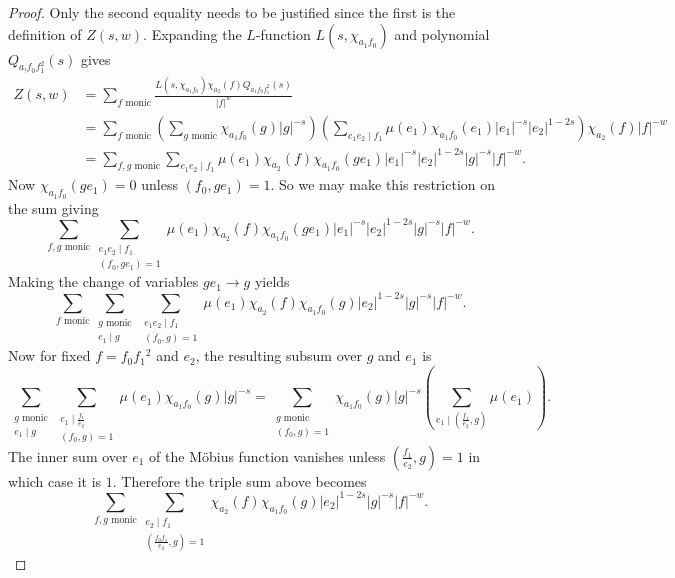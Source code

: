 \documentclass[12pt,reqno,oneside]{amsart}
\begin{document}
    \begin{proof}
        Only the second equality needs to be justified since the first is the definition of $Z(s,w)$. Expanding the $L$-function $L(s,\chi_{a_{1}f_{0}})$ and polynomial $Q_{a_{!}f_{0}f_{1}^{2}}(s)$ gives
        \begin{align*}
            Z(s,w) &= \sum_{\text{$f$ monic}}\frac{L(s,\chi_{a_{1}f_{0}})\chi_{a_{2}}(f)Q_{a_{1}f_{0}f_{1}^{2}}(s)}{|f|^{w}} \\
            &= \sum_{\text{$f$ monic}}\left(\sum_{\text{$g$ monic}}\chi_{a_{1}f_{0}}(g)|g|^{-s}\right)\left(\sum_{e_{1}e_{2} \mid f_{1}}\mu(e_{1})\chi_{a_{1}f_{0}}(e_{1})|e_{1}|^{-s}|e_{2}|^{1-2s}\right)\chi_{a_{2}}(f)|f|^{-w} \\
            &= \sum_{\text{$f,g$ monic}}\sum_{e_{1}e_{2} \mid f_{1}}\mu(e_{1})\chi_{a_{2}}(f)\chi_{a_{1}f_{0}}(ge_{1})|e_{1}|^{-s}|e_{2}|^{1-2s}|g|^{-s}|f|^{-w}.
        \end{align*}
        Now $\chi_{a_{1}f_{0}}(ge_{1}) = 0$ unless $(f_{0},ge_{1}) = 1$. So we may make this restriction on the sum giving
        \[
            \sum_{\text{$f,g$ monic}}\sum_{\substack{e_{1}e_{2} \mid f_{1} \\ (f_{0},ge_{1}) = 1}}\mu(e_{1})\chi_{a_{2}}(f)\chi_{a_{1}f_{0}}(ge_{1})|e_{1}|^{-s}|e_{2}|^{1-2s}|g|^{-s}|f|^{-w}.
        \]
        Making the change of variables $ge_{1} \to g$ yields
        \[
            \sum_{\text{$f$ monic}}\sum_{\substack{\text{$g$ monic} \\ e_{1} \mid g}}\sum_{\substack{e_{1}e_{2} \mid f_{1} \\ (f_{0},g) = 1}}\mu(e_{1})\chi_{a_{2}}(f)\chi_{a_{1}f_{0}}(g)|e_{2}|^{1-2s}|g|^{-s}|f|^{-w}.
        \]
        Now for fixed $f = f_{0}f_{1}{^{2}}$ and $e_{2}$, the resulting subsum over $g$ and $e_{1}$ is
        \[
            \sum_{\substack{\text{$g$ monic} \\ e_{1} \mid g}}\sum_{\substack{e_{1} \mid \frac{f_{1}}{e_{2}} \\ (f_{0},g) = 1}}\mu(e_{1})\chi_{a_{1}f_{0}}(g)|g|^{-s} = \sum_{\substack{\text{$g$ monic} \\ (f_{0},g) = 1}}\chi_{a_{1}f_{0}}(g)|g|^{-s}\left(\sum_{e_{1} \mid \left(\frac{f_{1}}{e_{2}},g\right)}\mu(e_{1})\right).
        \]
        The inner sum over $e_{1}$ of the M\"obius function vanishes unless $\left(\frac{f_{1}}{e_{2}},g\right) = 1$ in which case it is $1$. Therefore the triple sum above becomes
        \[
            \sum_{\text{$f,g$ monic}}\sum_{\substack{e_{2} \mid f_{1} \\ \left(\frac{f_{0}f_{1}}{e_{2}},g\right) = 1}}\chi_{a_{2}}(f)\chi_{a_{1}f_{0}}(g)|e_{2}|^{1-2s}|g|^{-s}|f|^{-w}.
\]
\end{proof}
\end{document}
